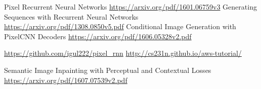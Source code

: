 \documentclass[10pt,twocolumn,letterpaper]{article}
\begin{document}
\begin{thebibliography}{1}
 Pixel Recurrent Neural Networks \url{https://arxiv.org/pdf/1601.06759v3}
 Generating Sequences with Recurrent Neural Networks \url{https://arxiv.org/pdf/1308.0850v5.pdf}
 Conditional Image Generation with PixelCNN Decoders \url{https://arxiv.org/pdf/1606.05328v2.pdf}


 \url{https://github.com/igul222/pixel_rnn}
 \url{http://cs231n.github.io/aws-tutorial/}

 Semantic Image Inpainting with Perceptual and Contextual Losses \url{https://arxiv.org/pdf/1607.07539v2.pdf}
\end{thebibliography}
\end{document}
